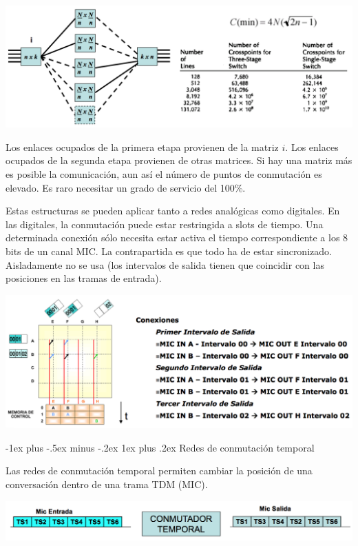 \documentclass[10pt,portrait, twocolumn]{article}
\makeatletter
\renewcommand{\subsubsection}{\@startsection{subsubsection}{3}{0mm}%
                                {-1ex plus -.5ex minus -.2ex}%
                                {1ex plus .2ex}%
                                {\normalfont\small\bfseries}}
\makeatother
\begin{document}
	\begin{center}
		\includegraphics[scale = 0.3]{espacial}
	\end{center}
	
Los enlaces ocupados de la primera etapa provienen de la matriz $i$. Los enlaces ocupados de la segunda etapa provienen de otras matrices. Si hay una matriz más es posible la comunicación, aun así el número de puntos de conmutación es elevado. Es raro necesitar un grado de servicio del 100\%. 

Estas estructuras se pueden aplicar tanto a redes analógicas como digitales. En las digitales, la conmutación puede estar restringida a slots de tiempo. Una determinada conexión sólo necesita estar activa el tiempo correspondiente a los 8 bits de un canal MIC. La contrapartida es que todo ha de estar sincronizado. Aisladamente no se usa (los intervalos de salida tienen que coincidir con las posiciones en las tramas de entrada).

	\begin{center}
		\includegraphics[scale = 0.3]{ee}
	\end{center}
	
\subsubsection{Redes de conmutación temporal}

Las redes de conmutación temporal permiten cambiar la posición de una conversación dentro de una trama TDM (MIC).

	\begin{center}
		\includegraphics[scale = 0.3]{temporal}
	\end{center}
\end{document}

